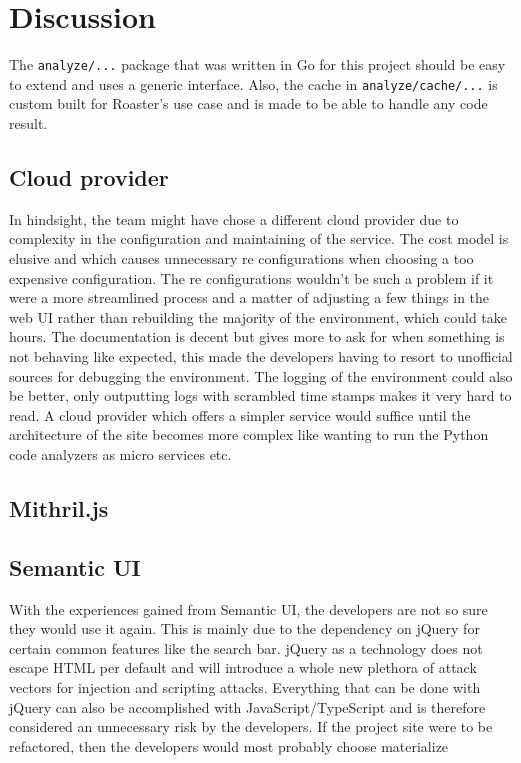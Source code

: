 \documentclass[12pt,a4paper]{report}
\begin{document}
\chapter{Discussion}

The \texttt{analyze/...} package that was written in Go for this project should be easy to extend and uses a generic interface. Also, the cache in \texttt{analyze/cache/...} is custom built for Roaster's use case and is made to be able to handle any code result.

\section{Cloud provider}
In hindsight, the team might have chose a different cloud provider due to complexity in the configuration and maintaining of the service. The cost model is elusive and which causes unnecessary re configurations when choosing a too expensive configuration. The re configurations wouldn't be such a problem if it were a more streamlined process and a matter of adjusting a few things in the web UI rather than rebuilding the majority of the environment, which could take hours. The documentation is decent but gives more to ask for when something is not behaving like expected, this made the developers having to resort to unofficial sources for debugging the environment. The logging of the environment could also be better, only outputting logs with scrambled time stamps makes it very hard to read. A cloud provider which offers a simpler service would suffice until the architecture of the site becomes more complex like wanting to run the Python code analyzers as micro services etc. 

\section{Mithril.js}
\section{Semantic UI}
With the experiences gained from Semantic UI, the developers are not so sure they would use it again. This is mainly due to the dependency on jQuery for certain common features like the search bar. jQuery as a technology does not escape HTML per default and will introduce a whole new plethora of attack vectors for injection and scripting attacks. Everything that can be done with jQuery can also be accomplished with JavaScript/TypeScript and is therefore considered an unnecessary risk by the developers.
If the project site were to be refactored, then the developers would most probably choose materialize 
\end{document}
